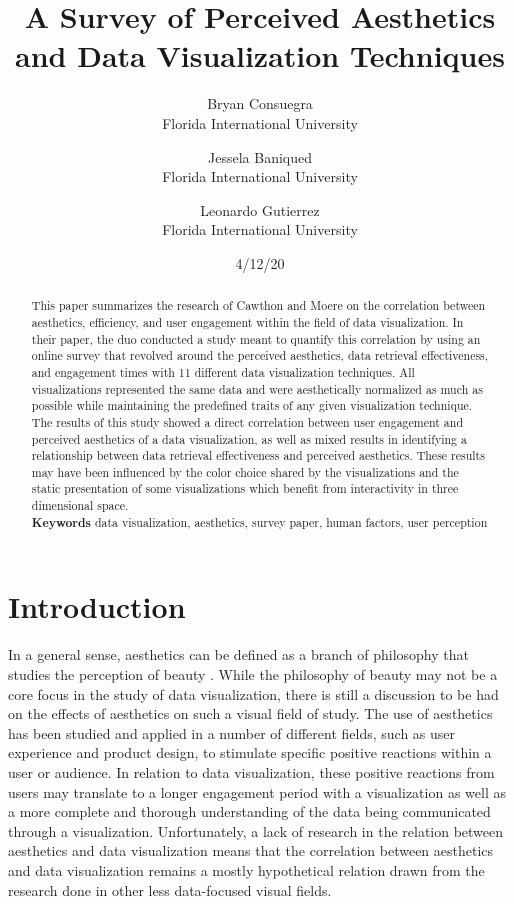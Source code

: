 \documentclass[twocolumn]{article}
\title{A Survey of Perceived Aesthetics and Data Visualization Techniques}
\author{Bryan Consuegra\\Florida International University \and Jessela Baniqued\\Florida International University \and Leonardo Gutierrez \\Florida International University}
\date{4/12/20}
\newcommand{\forceindent}{\leavevmode{\parindent=2em\indent}}
\begin{document}
	
	\maketitle
	
	\begin{abstract}
		
		\forceindent This paper summarizes the research of Cawthon and Moere \cite{1} on the correlation between aesthetics, efficiency, and user engagement within the field of data visualization. In their paper, the duo conducted a study meant to quantify this correlation by using an online survey that revolved around the perceived aesthetics, data retrieval effectiveness, and engagement times with 11 different data visualization techniques. All visualizations represented the same data and were aesthetically normalized as much as possible while maintaining the predefined traits of any given visualization technique. The results of this study showed a direct correlation between user engagement and perceived aesthetics of a data visualization, as well as mixed results in identifying a relationship between data retrieval effectiveness and perceived aesthetics. These results may have been influenced by the color choice shared by the visualizations and the static presentation of some visualizations which benefit from interactivity in three dimensional space. \\
		
		{\bf Keywords}  data visualization, aesthetics, survey paper, human factors, user perception
	\end{abstract}

	\section{Introduction}	
		
		\forceindent In a general sense, aesthetics can be defined as a branch of philosophy that studies the perception of beauty \cite{2}. While the philosophy of beauty may not be a core focus in the study of data visualization, there is still a discussion to be had on the effects of aesthetics on such a visual field of study. The use of aesthetics has been studied and applied in a number of different fields, such as user experience and product design, to stimulate specific positive reactions within a user or audience. In relation to data visualization, these positive reactions from users may translate to a longer engagement period with a visualization as well as a more complete and thorough understanding of the data being communicated through a visualization. Unfortunately, a lack of research in the relation between aesthetics and data visualization means that the correlation between aesthetics and data visualization remains a mostly hypothetical relation drawn from the research done in other less data-focused visual fields.
				
\end{document}
